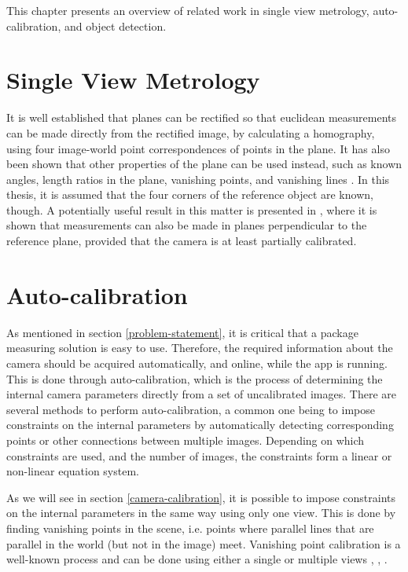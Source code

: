 This chapter presents an overview of related work in single view metrology, auto-calibration, and object detection.

\section{Single View Metrology}
It is well established that planes can be rectified so that euclidean measurements can be made directly from the rectified image, by calculating a homography, using four image-world point correspondences of points in the plane. %
It has also been shown that other properties of the plane can be used instead, such as known angles, length ratios in the plane, vanishing points, and vanishing lines \cite{liebowitz1998metric} \cite{criminisi2000single}.
In this thesis, it is assumed that the four corners of the reference object are known, though.
A potentially useful result in this matter is presented in \cite{huang2004new}, where it is shown that measurements can also be made in planes perpendicular to the reference plane, provided that the camera is at least partially calibrated.

\section{Auto-calibration}
As mentioned in section \ref{problem-statement}, it is critical that a package measuring solution is easy to use.
Therefore, the required information about the camera should be acquired automatically, and online, while the app is running.
This is done through auto-calibration, which is the process of determining the internal camera parameters directly from a set of uncalibrated images.
There are several methods to perform auto-calibration, a common one being to impose constraints on the internal parameters by automatically detecting corresponding points or other connections between multiple images. 
Depending on which constraints are used, and the number of images, the constraints form a linear or non-linear equation system. \cite[458-469]{hartley-zisserman} %

As we will see in section \ref{camera-calibration}, it is possible to impose constraints on the internal parameters in the same way using only one view.
This is done by finding vanishing points in the scene, i.e. points where parallel lines that are parallel in the world (but not in the image) meet.
Vanishing point calibration is a well-known process and can be done using either a single or multiple views \cite{guillou2000using}, \cite[195-226]{hartley-zisserman}, \cite{caprile1990using}.


